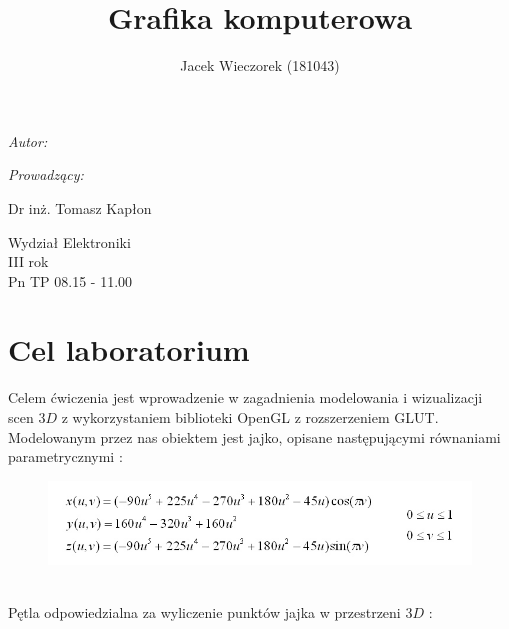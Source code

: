 \documentclass[wide,a4paper,titlepage,12pt] {article}
\title{Grafika komputerowa}
\author{Jacek Wieczorek (181043)}
\makeatletter
\renewcommand{\maketitle}{
\begin{titlepage}
  \begin{center}
    \vspace*{3cm}
    \LARGE \@title \par
    \vspace{2cm}
    \textit{\small Autor:}\par
    \normalsize \@author\par \normalsize
    \vspace{3cm}
    \textit{\small Prowadzący:}\par
    Dr inż. Tomasz Kapłon \par
    \vspace{2cm}
    Wydział Elektroniki\\ III rok\\ Pn TP 08.15 - 11.00\par
    \vspace{4cm}
    \small \@date
  \end{center}
\end{titlepage}
}
\makeatother
\begin{document}
\maketitle
  \section{Cel laboratorium}
	Celem ćwiczenia jest wprowadzenie w zagadnienia modelowania i wizualizacji scen $3D$ z wykorzystaniem biblioteki OpenGL z rozszerzeniem GLUT. Modelowanym przez nas obiektem jest jajko, opisane następującymi równaniami parametrycznymi : \\
\begin{figure}[htbp]
	 		\begin{center}
         \includegraphics[scale=0.6]{row.jpg}
     \end{center}
     \end{figure}
  \\ Pętla odpowiedzialna za wyliczenie punktów jajka w przestrzeni $3D$ :\\
\lstset{ %
    language=c++,                %
    basicstyle=\scriptsize,       %
    numbers=left,                   %
    numberstyle=\scriptsize,      %
    stepnumber=10,                   %
    numbersep=9pt,                  %
    showspaces=false,               %
    showstringspaces=false,         %
    showtabs=false,                 %
    breaklines=true,                %
    }
    
\newpage
\end{document}
